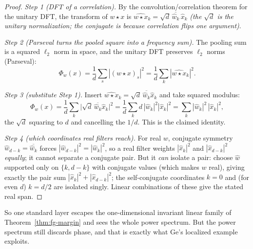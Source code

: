 \begin{proof}
\emph{Step 1 (DFT of a correlation).}
By the convolution/correlation theorem for the unitary DFT, the transform of $w\star x$ is
$\widehat{w\star x}_k = \sqrt{d}\,\overline{\hat w_k}\,\hat x_k$ \emph{(the $\sqrt d$ is the unitary
normalization; the conjugate is because correlation flips one argument)}.

\emph{Step 2 (Parseval turns the pooled square into a frequency sum).}
The pooling sum is a squared $\ell_2$ norm in space, and the unitary DFT preserves $\ell_2$ norms
(Parseval):
\[
\Phi_w(x) = \frac1d\sum_s |(w\star x)_s|^2 = \frac1d\sum_k |\widehat{w\star x}_k|^2 .
\]

\emph{Step 3 (substitute Step 1).}
Insert $\widehat{w\star x}_k = \sqrt d\,\overline{\hat w_k}\hat x_k$ and take squared modulus:
\[
\Phi_w(x) = \frac1d\sum_k \big|\sqrt d\,\overline{\hat w_k}\hat x_k\big|^2
          = \frac1d\sum_k d\,|\hat w_k|^2|\hat x_k|^2
          = \sum_k |\hat w_k|^2\,|\hat x_k|^2 ,
\]
the $\sqrt d$ squaring to $d$ and cancelling the $1/d$. This is the claimed identity.

\emph{Step 4 (which coordinates real filters reach).}
For real $w$, conjugate symmetry $\hat w_{d-k} = \overline{\hat w_k}$ forces $|\hat w_{d-k}|^2 =
|\hat w_k|^2$, so a real filter weights $|\hat x_k|^2$ and $|\hat x_{d-k}|^2$ \emph{equally}; it cannot
separate a conjugate pair. But it \emph{can} isolate a pair: choose $\hat w$ supported only on
$\{k, d-k\}$ with conjugate values (which makes $w$ real), giving exactly the pair sum
$|\hat x_k|^2 + |\hat x_{d-k}|^2$; the self-conjugate coordinates $k=0$ and (for even $d$) $k=d/2$ are
isolated singly. Linear combinations of these give the stated real span.
\end{proof}

So one standard layer escapes the one-dimensional invariant linear family of
Theorem~\ref{thm:fg-margin} and sees the whole power spectrum. But the power spectrum still discards
phase, and that is exactly what Ge's localized example exploits.

